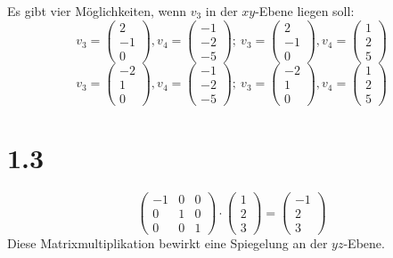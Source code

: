 \documentclass[a4paper]{scrartcl}
\begin{document}
Es gibt vier Möglichkeiten, wenn $v_3$ in der $xy$-Ebene liegen soll:\\
\[
	v_3 = \begin{pmatrix} 2 \\ -1 \\ 0 \end{pmatrix}, v_4 = \begin{pmatrix} -1 \\ -2 \\ -5 \end{pmatrix};\ 
	v_3 = \begin{pmatrix} 2 \\ -1 \\ 0 \end{pmatrix}, v_4 = \begin{pmatrix} 1 \\ 2 \\ 5 \end{pmatrix}\]
\[
	v_3 = \begin{pmatrix} -2 \\ 1 \\ 0 \end{pmatrix}, v_4 = \begin{pmatrix} -1 \\ -2 \\ -5 \end{pmatrix};\ 
	v_3 = \begin{pmatrix} -2 \\ 1 \\ 0 \end{pmatrix}, v_4 = \begin{pmatrix} 1 \\ 2 \\ 5 \end{pmatrix}
\]

\section*{1.3}
\[
	\begin{pmatrix}
	-1 & 0 & 0\\
	0 & 1 & 0 \\
	0 & 0 & 1
	\end{pmatrix} \cdot
	\begin{pmatrix}
	1 \\ 2 \\ 3
	\end{pmatrix}=
	\begin{pmatrix}
	-1 \\ 2 \\ 3
	\end{pmatrix}
\]
Diese Matrixmultiplikation bewirkt eine Spiegelung an der $yz$-Ebene.
\end{document}
